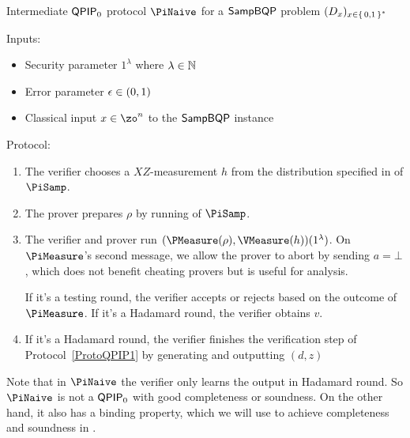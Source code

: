 \begin{protocol}{Intermediate $\operatorname{\mathsf{QPIP}}_0$ protocol $\PiNaive$ for a $\operatorname{\mathsf{SampBQP}}$ problem $(D_x)_{x\in\set{0, 1}^*}$}
	\label{proto:qpip0_naive}

	Inputs:
	\begin{itemize}
		\item Security parameter $1^\lambda$ where $\lambda\in\mathbb{N}$
		\item Error parameter $\epsilon\in(0, 1)$
		\item Classical input $x\in\zo^n$ to the $\operatorname{\mathsf{SampBQP}}$ instance
	\end{itemize}

	Protocol:
	\begin{enumerate}
		\item \label{step:naive1} The verifier chooses a $XZ$-measurement $h$ from the distribution specified in  of $\PiSamp$.
		\item \label{step:naive2} The prover prepares $\rho$ by running  of $\PiSamp$.
		\item \label{step:urmila-in-naive}
		    The verifier and prover run $(\PMeasure(\rho), \VMeasure(h))(1^\lambda)$. On $\PiMeasure$'s second message, we allow the prover to abort by sending $a=\bot$, which does not benefit cheating provers but is useful for analysis.
		    
			If it's a testing round, the verifier accepts or rejects based on the outcome of $\PiMeasure$.
			If it's a Hadamard round, the verifier obtains $v$.
		\item \label{step:naive-output} If it's a Hadamard round, the verifier finishes the verification step of Protocol~\ref{ProtoQPIP1} by generating and outputting $(d, z)$
			
	\end{enumerate}
\end{protocol}

Note that in $\PiNaive$ the verifier only learns the output in Hadamard round.
So $\PiNaive$ is not a $\operatorname{\mathsf{QPIP}}_0$ with good completeness or soundness.
On the other hand, it also has a binding property, which we will use to achieve completeness and soundness in .


